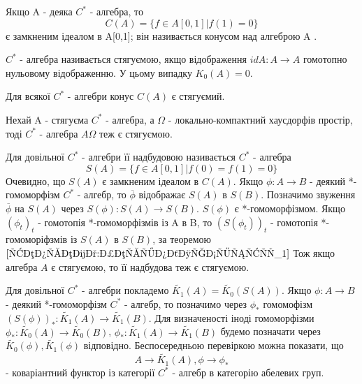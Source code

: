 Якщо A - деяка $C^*$ - алгебра, то
\begin{equation*}
    C(A) = \{f \in A[0,1] | f(1) = 0\}
\end{equation*}
є замкненим ідеалом в A[0,1]; він називається конусом над алгеброю A .

$C^*$ - алгебра називається стягуємою, якщо відображення $id A: A \to A$ гомотопно нульовому відображенню.
У цьому випадку $K_0(A) = 0$.

\begin{theorem}
    Для всякої $C^*$ - алгебри конус $C(A)$ є стягуємий.

\end{theorem}

\begin{theorem}
    Нехай A - стягуєма $C^*$ - алгебра, а $\Omega$ - локально-компактний хаусдорфів простір, тоді $C^*$ - алгебра $A\Omega$ теж є стягуємою.

\end{theorem}

Для довільної $C^*$ - алгебри її надбудовою називається $C^*$ - алгебра
\begin{equation*}
    S(A) = \{ f \in A[0,1] | f(0) = f(1) = 0\}
\end{equation*}
Очевидно, що $S(A)$ є замкненим ідеалом в $C(A)$.
Якщо $\phi: A \to B$ - деякий *-гомоморфізм $C^*$ - алгебр, то $\overline{\phi}$ відображає $S(A)$ в $S(B)$.
Позначимо звуження $\overline{\phi}$ на $S(A)$ через $S(\phi): S(A) \to S(B)$.
$S(\phi)$ є *-гомоморфізмом.
Якщо $(\phi_t)_t$ - гомотопія *-гомоморфізмів із A в B, то $(S(\phi_t))_t$ - гомотопія *-гомоморіфзмів із $S(A)$ в $S(B)$, за теоремою $\ref{теорема:періодичність_1}$
Тож якщо алгебра $A$ є стягуємою, то її надбудова теж є стягуємою.

Для довільної $C^*$ - алгебри покладемо $\widetilde{K_1}(A) = \widetilde{K_0}(S(A))$.
Якщо $\phi: A \to B$ - деякий *-гомоморфізм $C^*$ - алгебр,
то позначимо через $\phi_*$ гомомофізм $(S(\phi))_*: \widetilde{K_1}(A) \to \widetilde{K_1}(B)$.
Для визначеності іноді гомоморфізми $\phi_*: \widetilde{K_0}(A) \to \widetilde{K_0}(B)$,
$\phi_*: \widetilde{K_1}(A) \to \widetilde{K_1}(B)$ будемо позначати через $\widetilde{K_0}(\phi),\widetilde{K_1}(\phi)$ відповідно.
Беспосередньою перевіркою можна показати, що
\begin{equation*}
    A \to \widetilde{K_1}(A), \phi \to \phi_*
\end{equation*}
- коваріантний функтор із категорії $C^*$ - алгебр в категорію абелевих груп.

